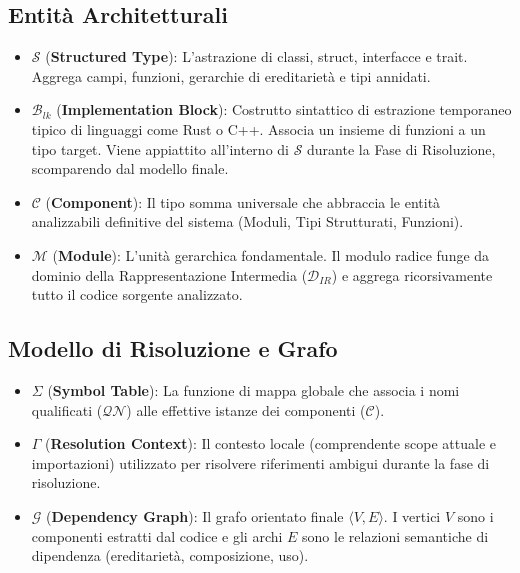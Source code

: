 \subsection{Entità Architetturali}
\begin{itemize}
  \item $\mathcal{S}$ (\textbf{Structured Type}): L'astrazione di
    classi, struct, interfacce e trait. Aggrega campi, funzioni,
    gerarchie di ereditarietà e tipi annidati.
  \item $\mathcal{B}_{lk}$ (\textbf{Implementation Block}): Costrutto
    sintattico di estrazione temporaneo tipico di linguaggi come Rust
    o C++. Associa un insieme di funzioni a un tipo target. Viene
    appiattito all'interno di $\mathcal{S}$ durante la Fase di
    Risoluzione, scomparendo dal modello finale.
  \item $\mathcal{C}$ (\textbf{Component}): Il tipo somma universale
    che abbraccia le entità analizzabili definitive del sistema
    (Moduli, Tipi Strutturati, Funzioni).
  \item $\mathcal{M}$ (\textbf{Module}): L'unità gerarchica
    fondamentale. Il modulo radice funge da dominio della
    Rappresentazione Intermedia ($\mathcal{D}_{IR}$) e aggrega
    ricorsivamente tutto il codice sorgente analizzato.
\end{itemize}

\subsection{Modello di Risoluzione e Grafo}
\begin{itemize}
  \item $\Sigma$ (\textbf{Symbol Table}): La funzione di mappa
    globale che associa i nomi qualificati ($\mathcal{QN}$) alle
    effettive istanze dei componenti ($\mathcal{C}$).
  \item $\Gamma$ (\textbf{Resolution Context}): Il contesto locale
    (comprendente scope attuale e importazioni) utilizzato per
    risolvere riferimenti ambigui durante la fase di risoluzione.
  \item $\mathcal{G}$ (\textbf{Dependency Graph}): Il grafo orientato
    finale $\langle V, E \rangle$. I vertici $V$ sono i componenti
    estratti dal codice e gli archi $E$ sono le relazioni semantiche
    di dipendenza (ereditarietà, composizione, uso).
\end{itemize}

